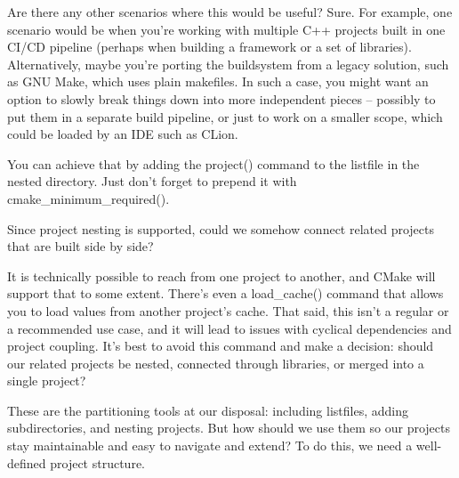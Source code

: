 Are there any other scenarios where this would be useful? Sure. For example, one scenario would be when you're working with multiple C++ projects built in one CI/CD pipeline (perhaps when building a framework or a set of libraries). Alternatively, maybe you're porting the buildsystem from a legacy solution, such as GNU Make, which uses plain makefiles. In such a case, you might want an option to slowly break things down into more independent pieces – possibly to put them in a separate build pipeline, or just to work on a smaller scope, which could be loaded by an IDE such as CLion.

You can achieve that by adding the project() command to the listfile in the nested directory. Just don't forget to prepend it with cmake\_minimum\_required().

Since project nesting is supported, could we somehow connect related projects that are built side by side?


It is technically possible to reach from one project to another, and CMake will support that to some extent. There's even a load\_cache() command that allows you to load values from another project's cache. That said, this isn't a regular or a recommended use case, and it will lead to issues with cyclical dependencies and project coupling. It's best to avoid this command and make a decision: should our related projects be nested, connected through libraries, or merged into a single project?

These are the partitioning tools at our disposal: including listfiles, adding subdirectories, and nesting projects. But how should we use them so our projects stay maintainable and easy to navigate and extend? To do this, we need a well-defined project structure.